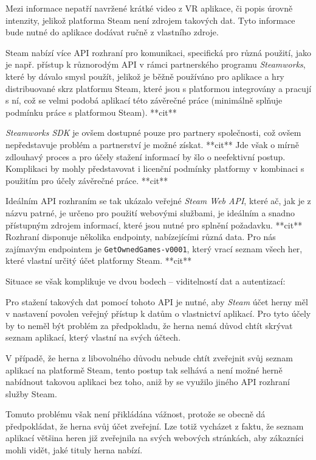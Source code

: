 Mezi informace nepatří navržené krátké video z VR aplikace, či popis úrovně
intenzity, jelikož platforma Steam není zdrojem takových dat. Tyto
informace bude nutné do aplikace dodávat ručně z vlastního zdroje.

Steam nabízí více API rozhraní pro komunikaci, specifická pro různá
použití, jako je např. přístup k různorodým API v rámci partnerského
programu \emph{Steamworks}, které by dávalo smysl použít, jelikož je
běžně používáno pro aplikace a hry distribuované skrz platformu Steam,
které jsou s platformou integrovány a pracují s ní, což se velmi podobá
aplikací této závěrečné práce (minimálně splňuje podmínku práce s
platformou Steam).  **cit**

\emph{Steamworks SDK} je ovšem dostupné pouze pro
partnery společnosti, což ovšem nepředstavuje problém a partnerství je možné získat. **cit**
Jde však o mírně zdlouhavý proces a pro účely stažení informací by šlo o
neefektivní postup. Komplikaci by mohly představovat i licenční podmínky
platformy v kombinaci s použitím pro účely závěrečné práce. **cit**

Ideálním API rozhraním se tak ukázalo veřejné \emph{Steam Web API},
které ač, jak je z názvu patrné, je určeno pro použití webovými
službami, je ideálním a snadno přístupným zdrojem informací, které jsou
nutné pro splnění požadavku. **cit** Rozhraní disponuje několika endpointy,
nabízejícími různá data. Pro nás zajímavým endpointem je
\texttt{GetOwnedGames-v0001}, který vrací seznam všech her, které
vlastní určitý účet platformy Steam. **cit**

Situace se však komplikuje ve dvou bodech -- viditelností dat a
autentizací:

Pro stažení takových dat pomocí tohoto API je nutné, aby \emph{Steam} 
účet herny měl v nastavení povolen veřejný přístup k
datům o vlastnictví aplikací. Pro tyto účely by to neměl být problém za
předpokladu, že herna nemá důvod chtít skrývat seznam aplikací, který vlastní
na svých účtech. 

V případě, že herna z libovolného důvodu nebude chtít
zveřejnit svůj seznam aplikací na platformě Steam, tento postup tak selhává a
není možné herně nabídnout takovou aplikaci bez toho, aniž by se využilo
jiného API rozhraní služby Steam. 

Tomuto problému však není přikládána
vážnost, protože se obecně dá předpokládat, že herna svůj účet zveřejní.
Lze totiž vycházet z faktu, že seznam aplikací většina heren již zveřejnila
na svých webových stránkách, aby zákazníci mohli vidět, jaké tituly
herna nabízí.

